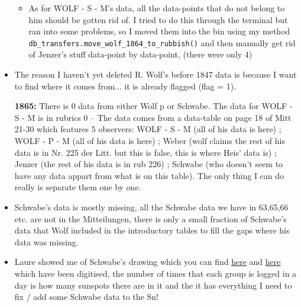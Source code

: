 \documentclass[12pt]{article}
\begin{document}
\begin{itemize}
\begin{itemize}[$\longrightarrow$]
        \item As for WOLF - S - M's data, all the data-points that do not belong to him should be gotten rid of. I tried to do this through the terminal but ran into some problems, so I moved them into the bin using my method \texttt{db\_transfers.move\_wolf\_1864\_to\_rubbish()} and then manually get rid of Jenzer's stuff data-point by data-point, (there were only 4)
   \end{itemize}
    \item The reason I haven't yet deleted R. Wolf's before 1847 data is because I want to find where it comes from... it is already flagged (flag = 1).
       \item[\textbf{1865:}] There is 0 data from either Wolf p or Schwabe. The data for WOLF - S - M is in rubrics 0 -- The data comes from a data-table on page 18 of Mitt 21-30 which features 5 observers: WOLF - S - M (all of his data is here) ; WOLF - P - M (all of his data is here) ; Weber (wolf claims the rest of his data is in Nr. 225 der Litt. but this is false, this is where Heis' data is) ; Jenzer (the rest of his data is in rub 226) ; Schwabe (who doesn't seem to have any data appart from what is on this table). The only thing I can do really is separate them one by one. 
    \item Schwabe's data is mostly missing, all the Schwabe data we have in 63,65,66 etc. are not in the Mitteilungen, there is only a small fraction of Schwabe's data that Wolf included in the introductory tables to fill the gaps where his data was missing. 
    \item Laure showed me of Schwabe's drawing which you can find \href{https://www.aip.de/Members/rarlt/sunspots/schwabe/paper-schwabe-data}{here} and \href{https://www.aip.de/Members/rarlt/sunspots/schwabe}{here} which have been digitised, the number of times that each group is logged in a day is how many sunspots there are in it and the it has everything I need to fix / add some Schwabe data to the Sn!
    
    


\end{itemize}
\end{document}
